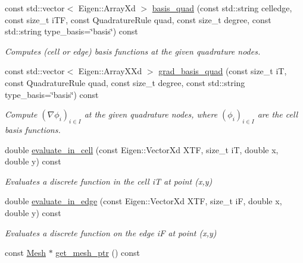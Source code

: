 \begin{DoxyCompactItemize}
const std\+::vector$<$ Eigen\+::\+Array\+Xd $>$ \hyperlink{classHArDCore2D_1_1HybridCore_acf453b4f239a76fe7f21b02ac91e127c}{basis\+\_\+quad} (const std\+::string celledge, const size\+\_\+t i\+TF, const Quadrature\+Rule quad, const size\+\_\+t degree, const std\+::string type\+\_\+basis=\char`\"{}basis\char`\"{}) const
\begin{DoxyCompactList}\small\item\em Computes (cell or edge) basis functions at the given quadrature nodes. \end{DoxyCompactList}\item 
const std\+::vector$<$ Eigen\+::\+Array\+X\+Xd $>$ \hyperlink{classHArDCore2D_1_1HybridCore_add794287f4bb49157a7b5f94a5ecb200}{grad\+\_\+basis\+\_\+quad} (const size\+\_\+t iT, const Quadrature\+Rule quad, const size\+\_\+t degree, const std\+::string type\+\_\+basis=\char`\"{}basis\char`\"{}) const
\begin{DoxyCompactList}\small\item\em Compute $(\nabla \phi_i)_{i\in I}$ at the given quadrature nodes, where $(\phi_i)_{i\in I}$ are the cell basis functions. \end{DoxyCompactList}\item 
\mbox{\label{classHArDCore2D_1_1HybridCore_a58dd478934c1f5b65ae8b7df31e8ead4}} 
double \hyperlink{classHArDCore2D_1_1HybridCore_a58dd478934c1f5b65ae8b7df31e8ead4}{evaluate\+\_\+in\+\_\+cell} (const Eigen\+::\+Vector\+Xd X\+TF, size\+\_\+t iT, double x, double y) const
\begin{DoxyCompactList}\small\item\em Evaluates a discrete function in the cell iT at point (x,y) \end{DoxyCompactList}\item 
\mbox{\label{classHArDCore2D_1_1HybridCore_ae6795e8bc0058be7e399b379333032c8}} 
double \hyperlink{classHArDCore2D_1_1HybridCore_ae6795e8bc0058be7e399b379333032c8}{evaluate\+\_\+in\+\_\+edge} (const Eigen\+::\+Vector\+Xd X\+TF, size\+\_\+t iF, double x, double y) const
\begin{DoxyCompactList}\small\item\em Evaluates a discrete function on the edge iF at point (x,y) \end{DoxyCompactList}\item 
const \hyperlink{classHArDCore2D_1_1Mesh}{Mesh} $\ast$ \hyperlink{group__HybridCore_gab3337e9e6d16154e080e247b3fa43d72}{get\+\_\+mesh\+\_\+ptr} () const

\end{DoxyCompactItemize}
